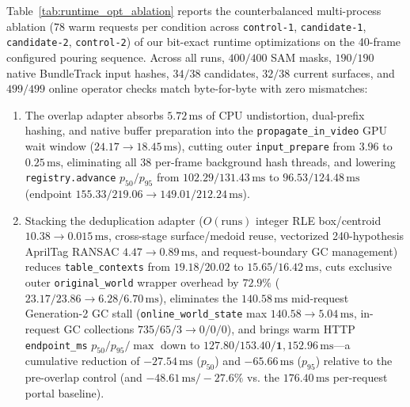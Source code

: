 \documentclass[10pt,journal]{IEEEtran}
\begin{document}
Table~\ref{tab:runtime_opt_ablation} reports the counterbalanced multi-process ablation ($78$ warm requests per condition across \texttt{control-1}, \texttt{candidate-1}, \texttt{candidate-2}, \texttt{control-2}) of our bit-exact runtime optimizations on the 40-frame configured pouring sequence. Across all runs, $400/400$ SAM masks, $190/190$ native BundleTrack input hashes, $34/38$ candidates, $32/38$ current surfaces, and $499/499$ online operator checks match byte-for-byte with zero mismatches:
\begin{enumerate}
    \item The overlap adapter absorbs $5.72\,\mathrm{ms}$ of CPU undistortion, dual-prefix hashing, and native buffer preparation into the \texttt{propagate\_in\_video} GPU wait window ($24.17\to 18.45\,\mathrm{ms}$), cutting outer \texttt{input\_prepare} from $3.96$ to $0.25\,\mathrm{ms}$, eliminating all $38$ per-frame background hash threads, and lowering \texttt{registry.advance} $p_{50}/p_{95}$ from $102.29/131.43\,\mathrm{ms}$ to $96.53/124.48\,\mathrm{ms}$ (endpoint $155.33/219.06\to 149.01/212.24\,\mathrm{ms}$).
    \item Stacking the deduplication adapter ($O(\text{runs})$ integer RLE box/centroid $10.38\to 0.015\,\mathrm{ms}$, cross-stage surface/medoid reuse, vectorized 240-hypothesis AprilTag RANSAC $4.47\to 0.89\,\mathrm{ms}$, and request-boundary GC management) reduces \texttt{table\_contexts} from $19.18/20.02$ to $15.65/16.42\,\mathrm{ms}$, cuts exclusive outer \texttt{original\_world} wrapper overhead by $\mathbf{72.9\%}$ ($23.17/23.86\to 6.28/6.70\,\mathrm{ms}$), eliminates the $140.58\,\mathrm{ms}$ mid-request Generation-2 GC stall (\texttt{online\_world\_state} max $140.58\to 5.04\,\mathrm{ms}$, in-request GC collections $735/65/3\to 0/0/0$), and brings warm HTTP \texttt{endpoint\_ms} $p_{50}/p_{95}/\max$ down to $\mathbf{127.80/153.40/1{,}152.96\,\mathrm{ms}}$---a cumulative reduction of $\mathbf{-27.54\,\mathrm{ms}}$ ($p_{50}$) and $\mathbf{-65.66\,\mathrm{ms}}$ ($p_{95}$) relative to the pre-overlap control (and $-48.61\,\mathrm{ms}/-27.6\%$ vs. the $176.40\,\mathrm{ms}$ per-request portal baseline).
\end{enumerate}
\end{document}
